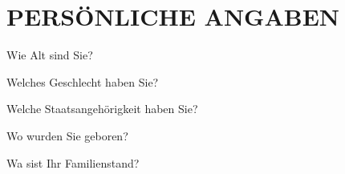 
\section{\uppercase{Persönliche Angaben}}
\vspace{-.15cm}

\begin{choicequestion}[6]{Wie Alt sind Sie?}
\end{choicequestion}

\vspace{-.15cm}
\separate
\vspace{-.15cm}

\begin{choicequestion}[1]{Welches Geschlecht haben Sie?}
\end{choicequestion}

\vspace{-.15cm}
\separate
\vspace{-.15cm}

\begin{choicequestion}[4]{Welche Staatsangehörigkeit haben Sie?}
	 \\
\end{choicequestion}

\vspace{-.15cm}
\separate
\vspace{-.15cm}

\begin{choicequestion}[4]{Wo wurden Sie geboren?}
	 \\
\end{choicequestion}

\vspace{-.15cm}
\separate
\vspace{-.15cm}

\begin{choicequestion}[1]{Wa sist Ihr Familienstand?}
\end{choicequestion}

\vspace{-.15cm}
\separate
\vspace{-.15cm}


